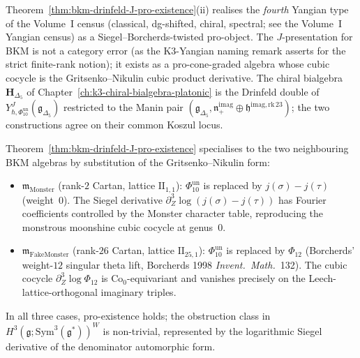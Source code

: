 \begin{remark}
\label{rem:bkm-J-four-yangian-types}
Theorem~\ref{thm:bkm-drinfeld-J-pro-existence}(ii) realises the
\emph{fourth} Yangian type of the Volume~I census (classical, dg-shifted,
chiral, spectral; see the Volume~I Yangian census) as a Siegel--Borcherds-twisted
pro-object. The $J$-presentation for BKM is not a category error
(as the K3-Yangian naming remark asserts for the strict
finite-rank notion); it exists as a pro-cone-graded algebra whose
cubic cocycle is the Gritsenko--Nikulin cubic product derivative.
The chiral bialgebra $\mathbf H_{\Delta_5}$ of
Chapter~\ref{ch:k3-chiral-bialgebra-platonic}
is the Drinfeld double of \(Y^J_{\hbar,\Phi_{10}^{\mathrm{un}}}(\mathfrak g_{\Delta_5})\)
restricted to the Manin pair
$(\mathfrak g_{\Delta_5},\mathfrak n_+^{\mathrm{imag}}\oplus\mathfrak h^{\mathrm{imag,rk\,23}})$;
the two constructions agree on their common Koszul locus.
\end{remark}

\begin{remark}
\label{rem:bkm-J-monster-fake-monster}
Theorem~\ref{thm:bkm-drinfeld-J-pro-existence} specialises to the two
neighbouring BKM algebras by substitution of the Gritsenko--Nikulin
form:
\begin{itemize}
\item $\mathfrak m_{\mathrm{Monster}}$ (rank-$2$ Cartan, lattice $\mathrm{II}_{1,1}$):
 \(\Phi_{10}^{\mathrm{un}}\) is replaced by \(j(\sigma)-j(\tau)\) (weight~$0$). The Siegel
 derivative $\partial^3_Z\log(j(\sigma)-j(\tau))$ has Fourier coefficients
 controlled by the Monster character table, reproducing the monstrous
 moonshine cubic cocycle at genus~$0$.
\item $\mathfrak m_{\mathrm{FakeMonster}}$ (rank-$26$ Cartan, lattice $\mathrm{II}_{25,1}$):
 \(\Phi_{10}^{\mathrm{un}}\) is replaced by \(\Phi_{12}\) (Borcherds' weight-$12$ singular
 theta lift, Borcherds 1998 \emph{Invent.\ Math.}~132). The cubic cocycle
 $\partial^3_Z\log\Phi_{12}$ is $\mathrm{Co}_0$-equivariant and vanishes
 precisely on the Leech-lattice-orthogonal imaginary triples.
\end{itemize}
In all three cases, pro-existence holds; the obstruction class in
$H^3(\mathfrak g;\mathrm{Sym}^3(\mathfrak g^*))^W$ is non-trivial, represented by
the logarithmic Siegel derivative of the denominator automorphic form.
\end{remark}

